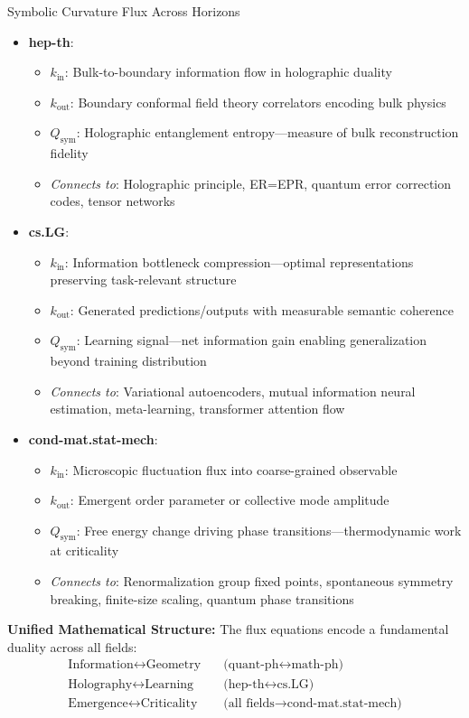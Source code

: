 \begin{scholium}{Symbolic Curvature Flux Across Horizons}
\begin{itemize}
\item \textbf{hep-th}:
  \begin{itemize}
  \item $k_{\text{in}}$: Bulk-to-boundary information flow in holographic duality
  \item $k_{\text{out}}$: Boundary conformal field theory correlators encoding bulk physics
  \item $Q_{\text{sym}}$: Holographic entanglement entropy—measure of bulk reconstruction fidelity
  \item \textit{Connects to}: Holographic principle, ER=EPR, quantum error correction codes, tensor networks
  \end{itemize}

\item \textbf{cs.LG}:
  \begin{itemize}
  \item $k_{\text{in}}$: Information bottleneck compression—optimal representations preserving task-relevant structure
  \item $k_{\text{out}}$: Generated predictions/outputs with measurable semantic coherence
  \item $Q_{\text{sym}}$: Learning signal—net information gain enabling generalization beyond training distribution
  \item \textit{Connects to}: Variational autoencoders, mutual information neural estimation, meta-learning, transformer attention flow
  \end{itemize}

\item \textbf{cond-mat.stat-mech}:
  \begin{itemize}
  \item $k_{\text{in}}$: Microscopic fluctuation flux into coarse-grained observable
  \item $k_{\text{out}}$: Emergent order parameter or collective mode amplitude
  \item $Q_{\text{sym}}$: Free energy change driving phase transitions—thermodynamic work at criticality
  \item \textit{Connects to}: Renormalization group fixed points, spontaneous symmetry breaking, finite-size scaling, quantum phase transitions
  \end{itemize}
\end{itemize}

\textbf{Unified Mathematical Structure:}
The flux equations encode a fundamental duality across all fields:
\begin{align}
\text{Information} \leftrightarrow \text{Geometry} &\quad \text{(quant-ph} \leftrightarrow \text{math-ph)} \\
\text{Holography} \leftrightarrow \text{Learning} &\quad \text{(hep-th} \leftrightarrow \text{cs.LG)} \\
\text{Emergence} \leftrightarrow \text{Criticality} &\quad \text{(all fields} \rightarrow \text{cond-mat.stat-mech)}
\end{align}


\end{scholium}
